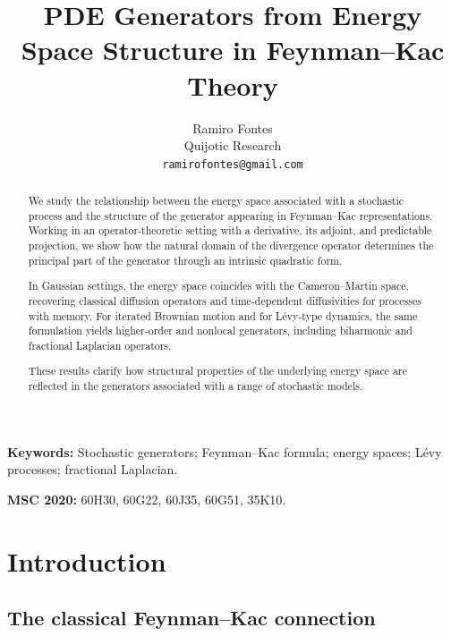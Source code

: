 \documentclass[12pt]{article}
\theoremstyle{plain}
\theoremstyle{definition}
\theoremstyle{remark}
\begin{document}
\title{PDE Generators from Energy Space Structure in Feynman--Kac Theory}
\author{Ramiro Fontes\\
Quijotic Research\\
\texttt{ramirofontes@gmail.com}}
\date{}
\maketitle

\begin{abstract}
We study the relationship between the energy space associated with a stochastic process and the structure of the generator appearing in Feynman--Kac representations. Working in an operator-theoretic setting with a derivative, its adjoint, and predictable projection, we show how the natural domain of the divergence operator determines the principal part of the generator through an intrinsic quadratic form.

In Gaussian settings, the energy space coincides with the Cameron--Martin space, recovering classical diffusion operators and time-dependent diffusivities for processes with memory. For iterated Brownian motion and for L\'{e}vy-type dynamics, the same formulation yields higher-order and nonlocal generators, including biharmonic and fractional Laplacian operators.

These results clarify how structural properties of the underlying energy space are reflected in the generators associated with a range of stochastic models.
\end{abstract}

\noindent\textbf{Keywords:} Stochastic generators; Feynman--Kac formula; energy spaces; L\'{e}vy processes; fractional Laplacian.

\noindent\textbf{MSC 2020:} 60H30, 60G22, 60J35, 60G51, 35K10.

\tableofcontents

\section{Introduction}

\subsection{The classical Feynman--Kac connection}
\end{document}
